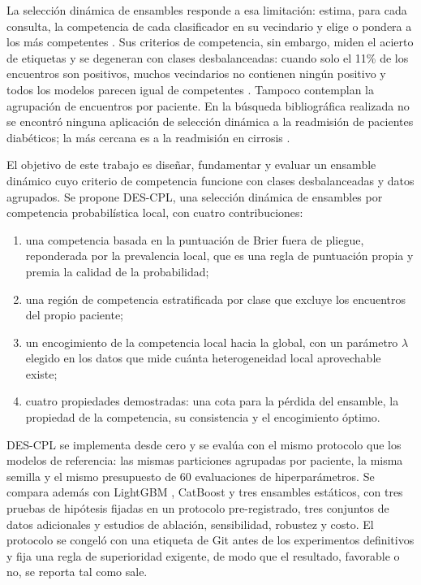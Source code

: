 \documentclass[pdflatex,sn-mathphys-num]{sn-jnl}
\theoremstyle{plain}
\begin{document}
La selección dinámica de ensambles responde a esa limitación: estima, para cada consulta, la competencia de cada clasificador en su vecindario y elige o pondera a los más competentes \cite{bib_woods_1997, bib_ko_2008, bib_cruz_2018}. Sus criterios de competencia, sin embargo, miden el acierto de etiquetas y se degeneran con clases desbalanceadas: cuando solo el 11\% de los encuentros son positivos, muchos vecindarios no contienen ningún positivo y todos los modelos parecen igual de competentes \cite{bib_cruz_2019, bib_garcia_2018}. Tampoco contemplan la agrupación de encuentros por paciente. En la búsqueda bibliográfica realizada no se encontró ninguna aplicación de selección dinámica a la readmisión de pacientes diabéticos; la más cercana es a la readmisión en cirrosis \cite{bib_shi_2025}.

El objetivo de este trabajo es diseñar, fundamentar y evaluar un ensamble dinámico cuyo criterio de competencia funcione con clases desbalanceadas y datos agrupados. Se propone DES-CPL, una selección dinámica de ensambles por competencia probabilística local, con cuatro contribuciones:
\begin{enumerate}
\item una competencia basada en la puntuación de Brier \cite{bib_brier} fuera de pliegue, reponderada por la prevalencia local, que es una regla de puntuación propia \cite{bib_gneiting_2007} y premia la calidad de la probabilidad;
\item una región de competencia estratificada por clase que excluye los encuentros del propio paciente;
\item un encogimiento de la competencia local hacia la global, con un parámetro $\lambda$ elegido en los datos que mide cuánta heterogeneidad local aprovechable existe;
\item cuatro propiedades demostradas: una cota para la pérdida del ensamble, la propiedad de la competencia, su consistencia y el encogimiento óptimo.
\end{enumerate}

DES-CPL se implementa desde cero y se evalúa con el mismo protocolo que los modelos de referencia: las mismas particiones agrupadas por paciente, la misma semilla y el mismo presupuesto de 60 evaluaciones de hiperparámetros. Se compara además con LightGBM \cite{bib_ke_2017}, CatBoost \cite{bib_prokhorenkova_2018} y tres ensambles estáticos, con tres pruebas de hipótesis fijadas en un protocolo pre-registrado, tres conjuntos de datos adicionales y estudios de ablación, sensibilidad, robustez y costo. El protocolo se congeló con una etiqueta de Git antes de los experimentos definitivos y fija una regla de superioridad exigente, de modo que el resultado, favorable o no, se reporta tal como sale.
\end{document}
